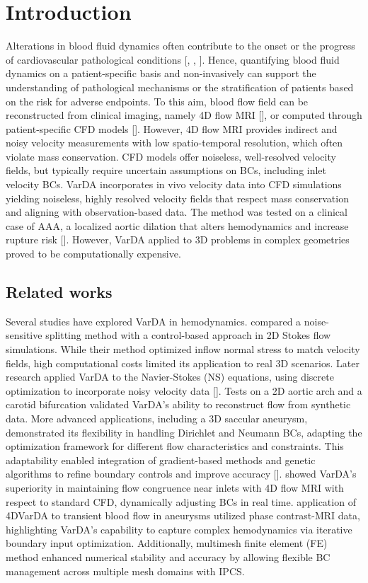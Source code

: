 \section*{Introduction}
Alterations in blood fluid dynamics often contribute to the onset or the progress of cardiovascular pathological conditions [\cite{Bappoo2021e013160}, \cite{Guzzardi2015892}, \cite{Pozzi2021}]. Hence, quantifying blood fluid dynamics on a patient-specific basis and non-invasively can support the understanding of pathological mechanisms or the stratification of patients based on the risk for adverse endpoints. To this aim, blood flow field can be reconstructed from clinical imaging, namely 4D flow MRI [\cite{Dyverfeldt2015}], or computed through patient-specific CFD models  [\cite{Salman2021}]. However, 4D flow MRI provides indirect and noisy velocity measurements with low spatio-temporal resolution, which often violate mass conservation. CFD models offer noiseless, well-resolved velocity fields, but typically require uncertain assumptions on BCs, including inlet velocity BCs. VarDA incorporates in vivo velocity data into CFD simulations yielding noiseless, highly resolved velocity fields that respect mass conservation and aligning with observation-based data. The method was tested on a clinical case of AAA, a localized aortic dilation that alters hemodynamics and increase rupture risk [\cite{Lattanzi2020}]. However, VarDA applied to 3D problems in complex geometries proved to be computationally expensive.

\subsection*{Related works}
\label{sec:background}

Several studies have explored VarDA in hemodynamics. \cite{Delia2013} compared a noise-sensitive splitting method with a control-based approach in 2D Stokes flow simulations. While their method optimized inflow normal stress to match velocity fields, high computational costs limited its application to real 3D scenarios. Later research applied VarDA to the Navier-Stokes (NS) equations, using discrete optimization to incorporate noisy velocity data [\cite{Delia2012}]. Tests on a 2D aortic arch and a carotid bifurcation validated VarDA's ability to reconstruct flow from synthetic data. More advanced applications, including a 3D saccular aneurysm, demonstrated its flexibility in handling Dirichlet and Neumann BCs, adapting the optimization framework for different flow characteristics and constraints. This adaptability enabled integration of gradient-based methods and genetic algorithms to refine boundary controls and improve accuracy [\cite{Tiago2017}]. \cite{Koltuklouglu2018} showed VarDA's superiority in maintaining flow congruence near inlets with 4D flow MRI with respect to standard CFD, dynamically adjusting BCs in real time. \cite{Funke2019} application of 4DVarDA to transient blood flow in aneurysms utilized phase contrast-MRI data, highlighting VarDA's capability to capture complex hemodynamics via iterative boundary input optimization. Additionally, \cite{Dokken2020} multimesh finite element (FE) method enhanced numerical stability and accuracy by allowing flexible BC management across multiple mesh domains with IPCS.

